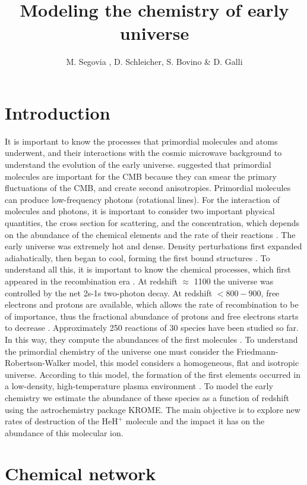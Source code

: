 \documentclass[baaa]{baaa}
\title{Modeling the chemistry of early universe}
\author{
M. Segovia \inst{1},
D. Schleicher\inst{1},
S. Bovino \inst{1}
\&
D. Galli \inst{2}
}
\institute{
Departamento de Astronom{\'\i}a, Universidad de Concepci\'on, Chile \and   
Osservatorio Astrofisico di Arcetri, INAF, Italia
}
\begin{document}
\maketitle

\section{Introduction}


It is important to know the processes that primordial molecules and atoms underwent, and their interactions with the cosmic microwave background to understand the evolution of the early universe. 
\citet{Maoli1994} suggested that primordial molecules are important for the CMB because they can smear the primary fluctuations of the CMB, and create second anisotropies.
Primordial molecules can produce low-frequency photons (rotational lines). For the interaction of molecules and photons, it is important to consider two important physical quantities, the cross section for scattering, and the concentration, which depends on the abundance of the chemical elements and the rate of their reactions \citet{Dubrovich1997}. 
The early universe was extremely hot and dense. Density perturbations first expanded adiabatically, then began to cool, forming the first bound structures \citet{Leep2002}. To understand all this, it is important to know the chemical processes, which first appeared in the recombination era \citet{Dalgarno2005}.
At redshift $\approx$ 1100 the universe was controlled by the net 2s-1s two-photon decay.  At redshift $<800-900$, free electrons and protons are available, which allows the rate of recombination to be of importance, thus the fractional abundance of protons and free electrons starts to decrease \citet{Chluba2010}. 
Approximately 250 reactions of 30 species have been studied so far. In this way, they compute the abundances of the first molecules \citet{Gay2011}. To understand the primordial chemistry of the universe one must consider the Friedmann-Robertson-Walker model, this model considers a homogeneous, flat and isotropic universe. According to this model, the formation of the first elements occurred in a low-density, high-temperature plasma environment \citet{GP2013}.
To model the early chemistry we estimate the abundance of these species as a function of redshift using the astrochemistry package \textsc{KROME}. The main objective is to explore new rates of destruction of the $\mathrm{HeH^+}$ molecule and the impact it has on the abundance of this molecular ion.


\section{Chemical network}
\end{document}

